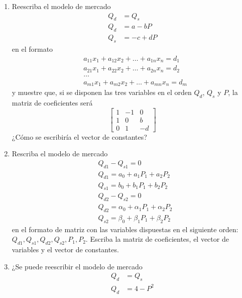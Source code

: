 \begin{ejercicio}
    \begin{enumerate}
        \item Reescriba el modelo de mercado 
        $$
        \begin{aligned}
            Q_d &=Q_s \\
            Q_d &= a - bP \\
            Q_s &= -c + dP
        \end{aligned}
        $$
        en el formato 
        $$
        \begin{aligned}
        & a_{11}x_1+a_{12}x_2+\dots+a_{1n}x_n = d_1\\ 
        & a_{21}x_1+a_{22}x_2+\dots+a_{2n}x_n = d_2 \\
        & \dots \\
        & a_{m1}x_1+a_{m2}x_2+\dots+a_{mn}x_n = d_m
        \end{aligned}
        $$
        y muestre que, si se disponen las tres variables en el orden \(Q_d\), \(Q_s\) y \(P\), la matriz de coeficientes será
        $$
        \begin{bmatrix}
            1 & -1 & 0 \\
            1 & 0 & b \\
            0 & 1 & -d
        \end{bmatrix}
        $$
        ¿Cómo se escribiría el vector de constantes?
        \item Rescriba el modelo de mercado 
        $$
        \begin{aligned}
        & Q_{d1}-Q_{s1}=0 \\
        & Q_{d1}=a_0+a_1P_1+a_2P_2 \\ 
        & Q_{s1}=b_0+b_1P_1+b_2P_2 \\
        & Q_{d2}-Q_{s2}=0 \\
        & Q_{d2}=\alpha_0+\alpha_1P_1+\alpha_2P_2 \\
        & Q_{s2}=\beta_0+\beta_1P_1+\beta_2P_2
        \end{aligned}
        $$
        en el formato de matriz con las variables dispuestas en el siguiente orden: \(Q_{d1}, Q_{s1}, Q_{d2}, Q_{s2}, P_1, P_2\). Escriba la matriz de coeficientes, el vector de variables y el vector de constantes.
        \item ¿Se puede reescribir el modelo de mercado 
        $$
        \begin{aligned}
        Q_d &= Q_s \\
        Q_d &= 4-P^2 \\

\end{aligned}$$
\end{enumerate}
\end{ejercicio}
